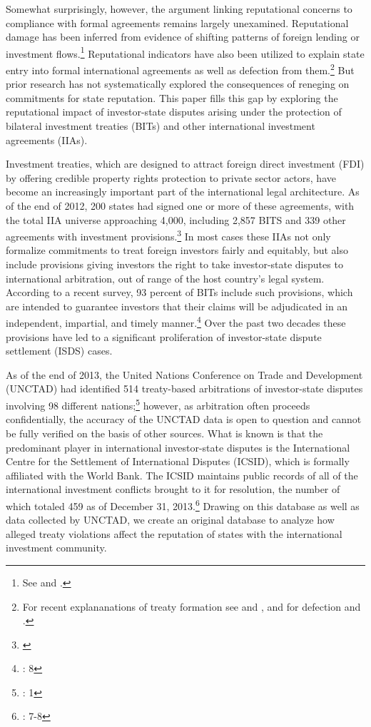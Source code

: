 \documentclass[12pt,onesided]{amsart}
\begin{document}
Somewhat surprisingly, however, the argument linking reputational concerns to compliance with formal agreements remains largely unexamined. Reputational damage has been inferred from evidence of shifting patterns of foreign lending or investment flows.\footnote{See \citet{tomz:2007} and \citet{allee:peinhardt:2011}.} Reputational indicators have also been utilized to explain state entry into formal international agreements as well as defection from them.\footnote{For recent explananations of treaty formation see \citet{elkins:etal:2006} and \citet{simmons:danner:2010}, and for defection \citet{allee:peinhardt:2011} and \citet{freeman:2013}.}  But prior research has not systematically explored the consequences of reneging on commitments for state reputation. This paper fills this gap by exploring the reputational impact of investor-state disputes arising under the protection of bilateral investment treaties (BITs) and other international investment agreements (IIAs).

Investment treaties, which are designed to attract foreign direct investment (FDI) by offering credible property rights protection to private sector actors, have become an increasingly important part of the international legal architecture. As of the end of 2012, 200 states had signed one or more of these agreements, with the total IIA universe approaching 4,000, including 2,857 BITS and 339 other agreements with investment provisions.\footnote{\citet{unctad:2013}} In most cases these IIAs not only formalize commitments to treat foreign investors fairly and equitably, but also include provisions giving investors the right to take investor-state disputes to international arbitration, out of range of the host country's legal system. According to a recent survey, 93 percent of BITs include such provisions, which are intended to guarantee investors that their claims will be adjudicated in an independent, impartial, and timely manner.\footnote{\citet{gaukordger:gordon:2012}: 8} Over the past two decades these provisions have led to a significant proliferation of investor-state dispute settlement (ISDS) cases.

As of the end of 2013, the United Nations Conference on Trade and Development (UNCTAD) had identified 514 treaty-based arbitrations of investor-state disputes involving 98 different nations;\footnote{\citet{unctad:2014}: 1} however, as arbitration often proceeds confidentially, the accuracy of the UNCTAD data is open to question and cannot be fully verified on the basis of other sources. What is known is that the predominant player in international investor-state disputes is the International Centre for the Settlement of International Disputes (ICSID), which is formally affiliated with the World Bank. The ICSID maintains public records of all of the international investment conflicts brought to it for resolution, the number of which totaled 459 as of December 31, 2013.\footnote{\citet{icsid:2014}: 7-8} Drawing on this database as well as data collected by UNCTAD, we create an original database to analyze how alleged treaty violations affect the reputation of states with the international investment community. 
\end{document}
